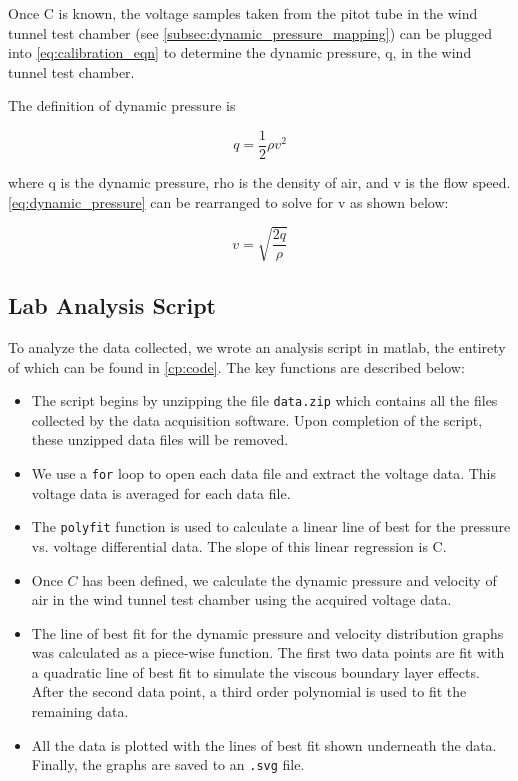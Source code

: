 Once \gls{C} is known, the voltage samples taken from the pitot tube in the wind tunnel test chamber (see \autoref{subsec:dynamic_pressure_mapping}) can be plugged into \autoref{eq:calibration_eqn} to determine the dynamic pressure, \gls{q}, in the wind tunnel test chamber.

The definition of dynamic pressure is

\begin{equation}\label{eq:dynamic_pressure}
    q = \frac{1}{2}\rho v^2
\end{equation}

\noindent{}where \gls{q} is the dynamic pressure, \gls{rho} is the density of air, and \gls{v} is the flow speed. \autoref{eq:dynamic_pressure} can be rearranged to solve for \gls{v} as shown below:

\begin{equation}\label{eq:velocity}
    v = \sqrt{\frac{2q}{\rho}}
\end{equation}

\subsection{Lab Analysis Script}\label{subsec:analysis_script}

To analyze the data collected, we wrote an analysis script in \acrfull{matlab}, the entirety of which can be found in \autoref{cp:code}. The key functions are described below:

\begin{itemize}
    \item The script begins by unzipping the file \verb|data.zip| which contains all the files collected by the data acquisition software. Upon completion of the script, these unzipped data files will be removed.
    \item We use a \verb|for| loop to open each data file and extract the voltage data. This voltage data is averaged for each data file.
    \item The \verb|polyfit| function is used to calculate a linear line of best for the pressure vs. voltage differential data. The slope of this linear regression is \gls{C}.
    \item Once $C$ has been defined, we calculate the dynamic pressure and velocity of air in the wind tunnel test chamber using the acquired voltage data.
    \item The line of best fit for the dynamic pressure and velocity distribution graphs was calculated as a piece-wise function. The first two data points are fit with a quadratic line of best fit to simulate the viscous boundary layer effects. After the second data point, a third order polynomial is used to fit the remaining data.
    \item All the data is plotted with the lines of best fit shown underneath the data. Finally, the graphs are saved to an \verb|.svg| file.
\end{itemize}
